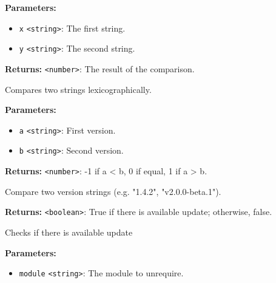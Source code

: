 \documentclass[12pt,a4paper]{article}
\begin{document}
\vspace{5mm}
\noindent {}


\noindent \textbf{Parameters:}
\begin{itemize}
  \item \texttt{x} \texttt{<string>}: The first string.
  \item \texttt{y} \texttt{<string>}: The second string.
\end{itemize}

\noindent \textbf{Returns:} \texttt{<number>}: The result of the comparison.

\noindent Compares two strings lexicographically.

\vspace{5mm}
\noindent {}


\noindent \textbf{Parameters:}
\begin{itemize}
  \item \texttt{a} \texttt{<string>}: First version.
  \item \texttt{b} \texttt{<string>}: Second version.
\end{itemize}

\noindent \textbf{Returns:} \texttt{<number>}: -1 if a < b, 0 if equal, 1 if a > b.

\noindent Compare two version strings (e.g. "1.4.2", "v2.0.0-beta.1").

\vspace{5mm}
\noindent {}


\noindent \textbf{Returns:} \texttt{<boolean>}: True if there is available update; otherwise, false.

\noindent Checks if there is available update

\vspace{5mm}
\noindent {}


\noindent \textbf{Parameters:}
\begin{itemize}
  \item \texttt{module} \texttt{<string>}: The module to unrequire.
\end{itemize}
\end{document}
